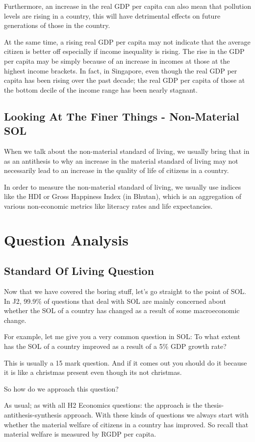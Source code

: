 Furthermore, an increase in the real GDP per capita can also mean that pollution levels are rising in a country, this will have detrimental effects on future generations of those in the country.

At the same time, a rising real GDP per capita may not indicate that the average citizen is better off especially if income inequality is rising. The rise in the GDP per capita may be simply because of an increase in incomes at those at the highest income brackets. In fact, in Singapore, even though the real GDP per capita has been rising over the past decade; the real GDP per capita of those at the bottom decile of the income range has been nearly stagnant. 
\subsection{Looking At The Finer Things - Non-Material SOL}
When we talk about the non-material standard of living, we usually bring that in as an antithesis to why an increase in the material standard of living may not necessarily lead to an increase in the quality of life of citizens in a country.

In order to measure the non-material standard of living, we usually use indices like the HDI or Gross Happiness Index (in Bhutan), which is an aggregation of various non-economic metrics like literacy rates and life expectancies.
\section{Question Analysis}
\subsection{Standard Of Living Question}
Now that we have covered the boring stuff, let’s go straight to the point of SOL. In J2, 99.9\% of questions that deal with SOL are mainly concerned about whether the SOL of a country has changed as a result of some macroeconomic change.

For example, let me give you a very common question in SOL: To what extent has the SOL of a country improved as a result of a 5\% GDP growth rate? 

This is usually a 15 mark question. And if it comes out you should do it because it is like a christmas present even though its not christmas.

So how do we approach this question?

As usual; as with all H2 Economics questions: the approach is the thesis-antithesis-synthesis approach. With these kinds of questions we always start with whether the material welfare of citizens in a country has improved. So recall that material welfare is measured by RGDP per capita.
